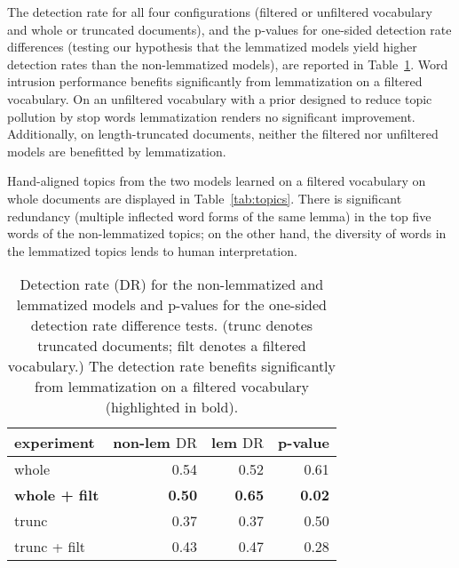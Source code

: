 \documentclass[11pt,letterpaper]{article}
\newcommand{\DR}{\ensuremath{\textrm{DR}}}
\newcommand{\Note}[3]{\sethlcolor{#2}\hl{[\textbf{#1}: #3]}}
\renewcommand{\Note}[3]{}
\newcommand{\todo}[1]{\Note{todo}{red}{#1}}
\begin{document}
{The detection rate for all four configurations (filtered or unfiltered
vocabulary and whole or truncated documents), and the
p-values for one-sided detection rate differences (testing our
hypothesis that the lemmatized models yield higher detection rates than
the non-lemmatized models), are reported in
Table~\ref{tab:detection-rate}.  Word intrusion performance benefits
significantly from lemmatization on a filtered vocabulary.  On an
unfiltered vocabulary with a prior designed to reduce topic pollution
by stop words lemmatization renders no significant improvement.
Additionally, on length-truncated documents, neither the filtered nor
unfiltered models are benefitted by lemmatization.

Hand-aligned topics from the two models learned on a filtered
vocabulary on whole documents are displayed in Table~\ref{tab:topics}.
There is significant redundancy (multiple inflected word forms of the
same lemma) in the top five words of the non-lemmatized topics; on the
other hand, the diversity of words in the lemmatized topics lends
to human interpretation.

\begin{table}
    \begin{tabular}{l|rr|r}
        experiment            & non-lem $\DR$ &     lem $\DR$ &       p-value \\\hline
        whole                 &          0.54 &          0.52 &          0.61 \\
        \textbf{whole + filt} & \textbf{0.50} & \textbf{0.65} & \textbf{0.02} \\
        trunc                 &          0.37 &          0.37 &          0.50 \\
        trunc + filt          &          0.43 &          0.47 &          0.28 \\
    \end{tabular}
    \caption{Detection rate ($\DR$) for the non-lemmatized and
        lemmatized models
        and p-values for the one-sided detection rate difference tests.
        (trunc denotes truncated documents; filt denotes a filtered
        vocabulary.)
        The detection rate benefits significantly from lemmatization on
        a filtered vocabulary (highlighted in bold).}
    \label{tab:detection-rate}
\end{table}

\todo{explain results, in particular look at configurations other than
    the significant one, and look at how a given document is
    represented in various models}


}
\end{document}
